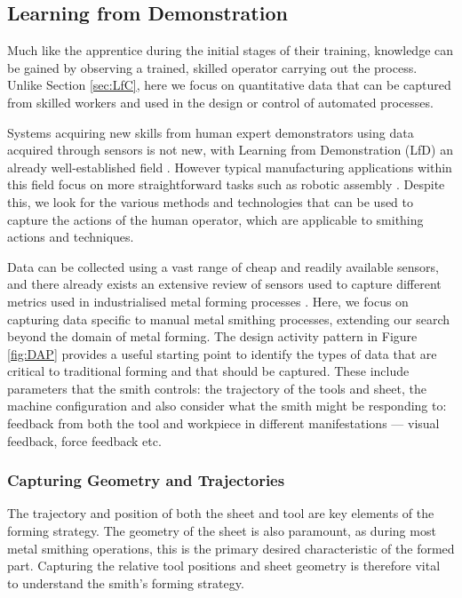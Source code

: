 \subsection{Learning from Demonstration} \label{sec:LfD} 
Much like the apprentice during the initial stages of their training, knowledge can be gained by observing a trained, skilled operator carrying out the process. Unlike Section \ref{sec:LfC}, here we focus on quantitative data that can be captured from skilled workers and used in the design or control of automated processes.

Systems acquiring new skills from human expert demonstrators using data acquired through sensors is not new, with Learning from Demonstration (LfD)  an already well-established field \citep{Ravichandar2020RecentDemonstration}. 
However typical manufacturing applications within this field focus on more straightforward tasks such as robotic assembly \citep{Zhu2018RobotSurvey}. Despite this, we look for the various methods and technologies that can be used to capture the actions of the human operator, which are applicable to smithing actions and techniques.

Data can be collected using a vast range of cheap and readily available sensors, and there already exists an extensive review of sensors used to capture different metrics used in industrialised metal forming processes \citep{Allwood2016Closed-loopForming}. Here, we focus on capturing data specific to manual metal smithing processes, extending our search beyond the domain of metal forming. The design activity pattern in Figure \ref{fig:DAP} provides a useful starting point to identify the types of data that are critical to traditional forming and that should be captured. These include parameters that the smith controls: the trajectory of the tools and sheet, the machine configuration and also consider what the smith might be responding to: feedback from both the tool and workpiece in different manifestations --- visual feedback, force feedback etc. 

\subsubsection{Capturing Geometry and Trajectories}
The trajectory and position of both the sheet and tool are key elements of the forming strategy. The geometry of the sheet is also paramount, as during most metal smithing operations, this is the primary desired characteristic of the formed part. Capturing the relative tool positions and sheet geometry is therefore vital to understand the smith’s forming strategy.

